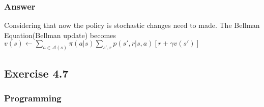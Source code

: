 \begin{Document}
\subsubsection{Answer}
Considering that now the policy is stochastic changes need to made. The Bellman Equation(Bellman update) becomes $v(s) \longleftarrow \sum_{a \in \mathcal{A}(s)} \pi(a|s)\sum_{s', r}p(s', r|s, a)\left[ r + \gamma v(s') \right]$

\subsection{Exercise 4.7}
\subsubsection{Programming}

\end{Document}
